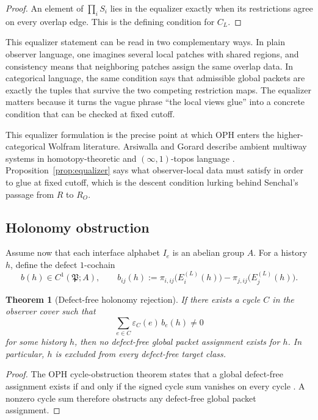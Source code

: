 \documentclass[11pt]{article}
\newtheorem{theorem}{Theorem}[section]
\theoremstyle{remark}
\theoremstyle{plain}
\begin{document}
\begin{proof}
An element of \(\prod_i S_i\) lies in the equalizer exactly when its restrictions agree on every overlap edge. This is the defining condition for \(C_L\).
\end{proof}

This equalizer statement can be read in two complementary ways. In plain observer language, one imagines several local patches with shared regions, and consistency means that neighboring patches assign the same overlap data. In categorical language, the same condition says that admissible global packets are exactly the tuples that survive the two competing restriction maps. The equalizer matters because it turns the vague phrase ``the local views glue'' into a concrete condition that can be checked at fixed cutoff.

This equalizer formulation is the precise point at which OPH enters the higher-categorical Wolfram literature. Arsiwalla and Gorard describe ambient multiway systems in homotopy-theoretic and \((\infty,1)\)-topos language \cite{arsiwalla2021nfold,arsiwalla2021pregeometric}. Proposition~\ref{prop:equalizer} says what observer-local data must satisfy in order to glue at fixed cutoff, which is the descent condition lurking behind Senchal's passage from \(R\) to \(R_O\).

\subsection{Holonomy obstruction}

Assume now that each interface alphabet \(I_e\) is an abelian group \(A\). For a history \(h\), define the defect \(1\)-cochain
\[
b(h)\in C^1(\mathfrak P;A),
\qquad
b_{ij}(h):=
\pi_{i,ij}\bigl(E_i^{(L)}(h)\bigr)-\pi_{j,ij}\bigl(E_j^{(L)}(h)\bigr).
\]

\begin{theorem}[Defect-free holonomy rejection]
\label{thm:holonomyreject}
If there exists a cycle \(C\) in the observer cover such that
\[
\sum_{e\in C}\varepsilon_C(e)\,b_e(h)\neq 0
\]
for some history \(h\), then no defect-free global packet assignment exists for \(h\). In particular, \(h\) is excluded from every defect-free target class.
\end{theorem}

\begin{proof}
The OPH cycle-obstruction theorem states that a global defect-free assignment exists if and only if the signed cycle sum vanishes on every cycle \cite{ophconsensus}. A nonzero cycle sum therefore obstructs any defect-free global packet assignment.
\end{proof}
\end{document}
